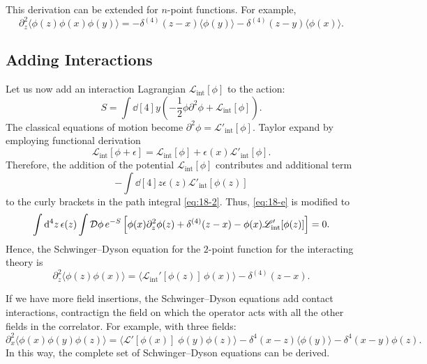 
This derivation can be extended for $n$-point functions. For example, 
\begin{equation}
  \partial^2_z \langle \phi(z) \phi(x) \phi(y) \rangle = - \delta^{(4)} (z - x) \langle \phi(y) \rangle - \delta^{(4)} (z - y) \langle \phi(x) \rangle.
\end{equation}

\subsection{Adding Interactions}%
\label{sub:adding_interactions}

Let us now add an interaction Lagrangian $\mathscr{L}_{\text{int}}[\phi]$ to the action:
\begin{equation}
  S = \int \dd[4]{y} \left( -\frac{1}{2} \phi \partial^2 \phi + \mathscr{L}_{\text{int}}[\phi] \right).
\end{equation}
The classical equations of motion become $\partial^2 \phi = \mathscr{L}'_{\text{int}}[\phi]$.
Taylor expand by employing functional derivation
\begin{equation}
  \mathscr{L}_{\text{int}} [\phi + \epsilon] = \mathscr{L}_{\text{int}} [\phi] + \epsilon(x) \mathscr{L}'_{\text{int}}[\phi].
\end{equation}
Therefore, the addition of the potential $\mathscr{L}_{\text{int}}[\phi]$ contributes and additional term
\begin{equation}
  - \int \dd[4]{z} \epsilon(z) \mathscr{L}'_{\text{int}}[\phi(z)]
\end{equation}
to the curly brackets in the path integral \eqref{eq:18-2}.
Thus, \eqref{eq:18-e} is modified to 
\begin{equation}
  \int \dd[4]{z} \epsilon(z) \int \mathop{\mathcal{D} \phi} e^{-S} \left[ \phi(x) \partial^2_z \phi(z) + \delta^{(4)}(z - x) - \phi(x) \mathscr{L}'_{\text{int}}[\phi(z)] \right] = 0.
\end{equation}
Hence, the Schwinger--Dyson equation for the $2$-point function for the interacting theory is
\begin{equation}
  \partial^2_z \langle \phi(z) \phi(x) \rangle = \langle \mathscr{L}_{\text{int}}'[\phi(z)] \, \phi(x) \rangle - \delta^{(4)} (z - x).
\end{equation}

If we have more field insertions, the Schwinger--Dyson equations add contact interactions, contractign the field on which the operator acts with all the other fields in the correlator. For example, with three fields:
\begin{equation}
  \partial^2_x \langle \phi(x) \phi(y) \phi(z) \rangle = \langle \mathscr{L}'[\phi(x)] \; \phi(y) \phi(z) \rangle - \delta^4 (x - z) \langle \phi(y) \rangle - \delta^4 (x - y) \phi(z).
\end{equation}
In this way, the complete set of Schwinger--Dyson equations can be derived.

